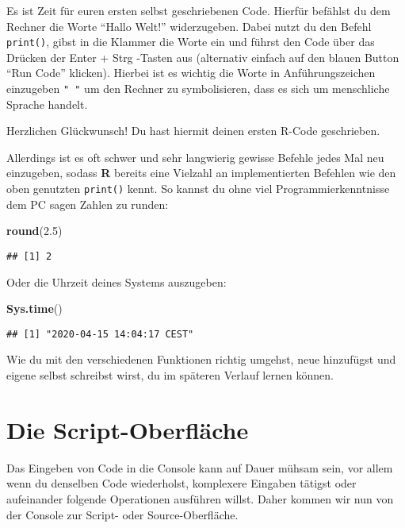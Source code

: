 \documentclass[
]{book}
\newenvironment{Shaded}{\begin{snugshade}}{\end{snugshade}}
\newcommand{\FloatTok}[1]{\textcolor[rgb]{0.00,0.00,0.81}{#1}}
\newcommand{\KeywordTok}[1]{\textcolor[rgb]{0.13,0.29,0.53}{\textbf{#1}}}
\newcommand{\NormalTok}[1]{#1}
\begin{document}
Es ist Zeit für euren ersten selbst geschriebenen Code. Hierfür befählst du dem Rechner die Worte ``Hallo Welt!'' widerzugeben. Dabei nutzt du den Befehl \texttt{print()}, gibst in die Klammer die Worte ein und führst den Code über das Drücken der Enter + Strg -Tasten aus (alternativ einfach auf den blauen Button ``Run Code'' klicken). Hierbei ist es wichtig die Worte in Anführungszeichen einzugeben \texttt{"\ "} um den Rechner zu symbolisieren, dass es sich um menschliche Sprache handelt.

Herzlichen Glückwunsch! Du hast hiermit deinen ersten R-Code geschrieben.

Allerdings ist es oft schwer und sehr langwierig gewisse Befehle jedes Mal neu einzugeben, sodass \textbf{R} bereits eine Vielzahl an implementierten Befehlen wie den oben genutzten \texttt{print()} kennt.
So kannst du ohne viel Programmierkenntnisse dem PC sagen Zahlen zu runden:

\begin{Shaded}
\begin{Highlighting}[]
\KeywordTok{round}\NormalTok{(}\FloatTok{2.5}\NormalTok{)}
\end{Highlighting}
\end{Shaded}

\begin{verbatim}
## [1] 2
\end{verbatim}

Oder die Uhrzeit deines Systems auszugeben:

\begin{Shaded}
\begin{Highlighting}[]
\KeywordTok{Sys.time}\NormalTok{()}
\end{Highlighting}
\end{Shaded}

\begin{verbatim}
## [1] "2020-04-15 14:04:17 CEST"
\end{verbatim}

Wie du mit den verschiedenen Funktionen richtig umgehst, neue hinzufügst und eigene selbst schreibst wirst, du im späteren Verlauf lernen können.

\hypertarget{die-script-oberfluxe4che}{%
\section{Die Script-Oberfläche}\label{die-script-oberfluxe4che}}

Das Eingeben von Code in die Console kann auf Dauer mühsam sein, vor allem wenn du denselben Code wiederholst, komplexere Eingaben tätigst oder aufeinander folgende Operationen ausführen willst. Daher kommen wir nun von der Console zur Script- oder Source-Oberfläche.
\end{document}
